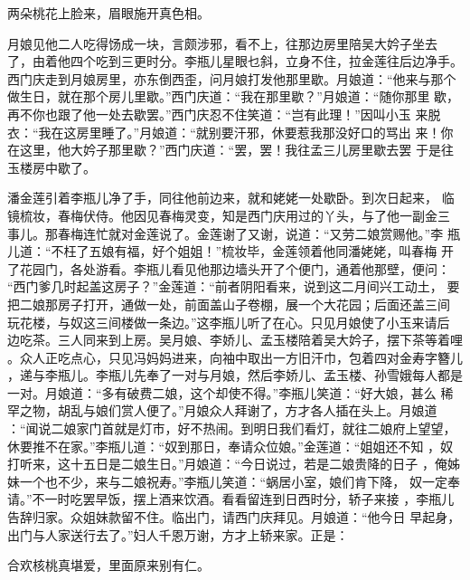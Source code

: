 两朵桃花上脸来，眉眼施开真色相。

月娘见他二人吃得饧成一块，言颇涉邪，看不上，往那边房里陪吴大妗子坐去
了，由着他四个吃到三更时分。李瓶儿星眼乜斜，立身不住，拉金莲往后边净手。
西门庆走到月娘房里，亦东倒西歪，问月娘打发他那里歇。月娘道：“他来与那个
做生日，就在那个房儿里歇。”西门庆道：“我在那里歇？”月娘道：“随你那里
歇，再不你也跟了他一处去歇罢。”西门庆忍不住笑道：“岂有此理！”因叫小玉
来脱衣：“我在这房里睡了。”月娘道：“就别要汗邪，休要惹我那没好口的骂出
来！你在这里，他大妗子那里歇？”西门庆道：“罢，罢！我往孟三儿房里歇去罢
于是往玉楼房中歇了。

潘金莲引着李瓶儿净了手，同往他前边来，就和姥姥一处歇卧。到次日起来，
临镜梳妆，春梅伏侍。他因见春梅灵变，知是西门庆用过的丫头，与了他一副金三
事儿。那春梅连忙就对金莲说了。金莲谢了又谢，说道：“又劳二娘赏赐他。”李
瓶儿道：“不枉了五娘有福，好个姐姐！”梳妆毕，金莲领着他同潘姥姥，叫春梅
开了花园门，各处游看。李瓶儿看见他那边墙头开了个便门，通着他那壁，便问：
“西门爹几时起盖这房子？”金莲道：“前者阴阳看来，说到这二月间兴工动土，
要把二娘那房子打开，通做一处，前面盖山子卷棚，展一个大花园；后面还盖三间
玩花楼，与奴这三间楼做一条边。”这李瓶儿听了在心。只见月娘使了小玉来请后
边吃茶。三人同来到上房。吴月娘、李娇儿、孟玉楼陪着吴大妗子，摆下茶等着哩
。众人正吃点心，只见冯妈妈进来，向袖中取出一方旧汗巾，包着四对金寿字簪儿
，递与李瓶儿。李瓶儿先奉了一对与月娘，然后李娇儿、孟玉楼、孙雪娥每人都是
一对。月娘道：“多有破费二娘，这个却使不得。”李瓶儿笑道：“好大娘，甚么
稀罕之物，胡乱与娘们赏人便了。”月娘众人拜谢了，方才各人插在头上。月娘道
：“闻说二娘家门首就是灯市，好不热闹。到明日我们看灯，就往二娘府上望望，
休要推不在家。”李瓶儿道：“奴到那日，奉请众位娘。”金莲道：“姐姐还不知
，奴打听来，这十五日是二娘生日。”月娘道：“今日说过，若是二娘贵降的日子
，俺姊妹一个也不少，来与二娘祝寿。”李瓶儿笑道：“蜗居小室，娘们肯下降，
奴一定奉请。”不一时吃罢早饭，摆上酒来饮酒。看看留连到日西时分，轿子来接
，李瓶儿告辞归家。众姐妹款留不住。临出门，请西门庆拜见。月娘道：“他今日
早起身，出门与人家送行去了。”妇人千恩万谢，方才上轿来家。正是：

合欢核桃真堪爱，里面原来别有仁。